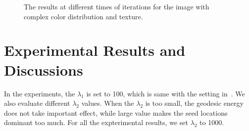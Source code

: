\documentclass{article}
\begin{document}
\begin{figure}[htbp]
    \centering
   \caption{The results at different times of iterations for the image with complex color distribution and texture.}
\label{fig:figgeoiter}
\end{figure}
%

\vspace{-5mm}
\section{Experimental Results and Discussions}
\label{sec:Exp}
\vspace{-2mm}

In the experiments, the $\lambda_{1}$ is set to 100, which is same with the setting in~\cite{nguyen2012robust}. We also evaluate different $\lambda_{2}$ values. When the $\lambda_2$ is too small, the geodesic energy does not take important effect, while large value makes the seed locations dominant too much. For all the expterimental results, we set $\lambda_2$ to 1000.
\end{document}

